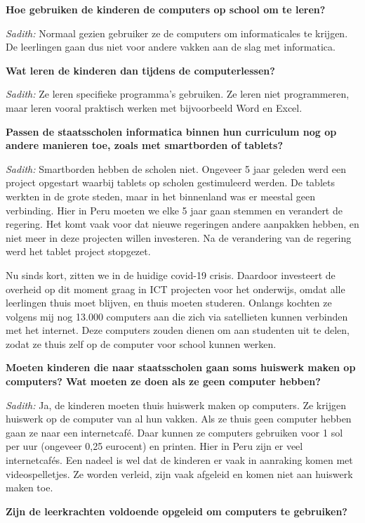 \textbf{Hoe gebruiken de kinderen de computers op school om te leren?}

\textit{Sadith:} Normaal gezien gebruiker ze de computers om informaticales te krijgen. De leerlingen gaan dus niet voor andere vakken aan de slag met informatica. 

\textbf{Wat leren de kinderen dan tijdens de computerlessen?}

\textit{Sadith:} Ze leren specifieke programma's gebruiken. Ze leren niet programmeren, maar leren vooral praktisch werken met bijvoorbeeld Word en Excel.

\textbf{Passen de staatsscholen informatica binnen hun curriculum nog op andere manieren toe, zoals met smartborden of tablets?}

\textit{Sadith:} Smartborden hebben de scholen niet. Ongeveer 5 jaar geleden werd een project opgestart waarbij tablets op scholen gestimuleerd werden. De tablets werkten in de grote steden, maar in het binnenland was er meestal geen verbinding. Hier in Peru moeten we elke 5 jaar gaan stemmen en verandert de regering. Het komt vaak voor dat nieuwe regeringen andere aanpakken hebben, en niet meer in deze projecten willen investeren. Na de verandering van de regering werd het tablet project stopgezet.

Nu sinds kort, zitten we in de huidige covid-19 crisis. Daardoor investeert de overheid op dit moment graag in ICT projecten voor het onderwijs, omdat alle leerlingen thuis moet blijven, en thuis moeten studeren. Onlangs kochten ze volgens mij nog 13.000 computers aan die zich via satellieten kunnen verbinden met het internet. Deze computers zouden dienen om aan studenten uit te delen, zodat ze thuis zelf op de computer voor school kunnen werken. 

\textbf{Moeten kinderen die naar staatsscholen gaan soms huiswerk maken op computers? Wat moeten ze doen als ze geen computer hebben?}

\textit{Sadith:} Ja, de kinderen moeten thuis huiswerk maken op computers. Ze krijgen huiswerk op de computer van al hun vakken. Als ze thuis geen computer hebben gaan ze naar een internetcafé. Daar kunnen ze computers gebruiken voor 1 sol per uur (ongeveer 0,25 eurocent) en printen. Hier in Peru zijn er veel internetcafés. Een nadeel is wel dat de kinderen er vaak in aanraking komen met videospelletjes. Ze worden verleid, zijn vaak afgeleid en komen niet aan huiswerk maken toe. 

\textbf{Zijn de leerkrachten voldoende opgeleid om computers te gebruiken?}

